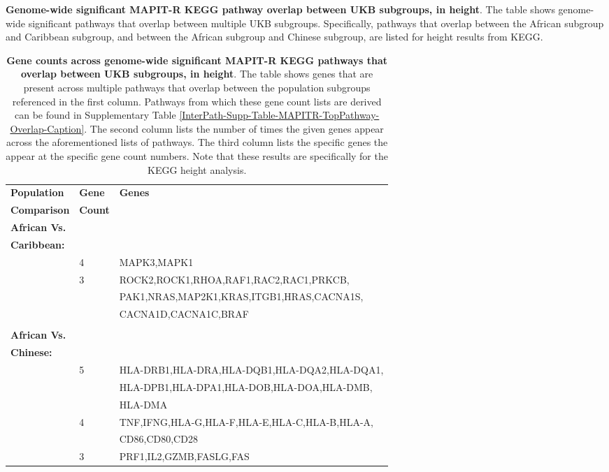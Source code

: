 \documentclass[12pt,a4paper]{article}
\begin{document}
\addtocounter{table}{-1}
\begin{table} [t!]
  \caption{\textbf{Genome-wide significant MAPIT-R KEGG pathway overlap between UKB subgroups, in height}. The table shows genome-wide significant pathways that overlap between multiple UKB subgroups. Specifically, pathways that overlap between the African subgroup and Caribbean subgroup, and between the African subgroup and Chinese subgroup, are listed for height results from KEGG.}
\label{InterPath-Supp-Table-MAPITR-TopPathway-Overlap-Caption}
\end{table}
\clearpage

\setlength{\footskip}{2cm}
\begin{table}[ht]
\centering
\begin{tabular}{lll}
  \hline
 \textbf{Population} & \textbf{Gene} & \textbf{Genes} \\
 \textbf{Comparison} & \textbf{Count} & \\
  \hline
\textbf{African Vs.} & & \\
\textbf{Caribbean:} & & \\
& 4 & MAPK3,MAPK1 \\
& 3 & ROCK2,ROCK1,RHOA,RAF1,RAC2,RAC1,PRKCB, \\
& & PAK1,NRAS,MAP2K1,KRAS,ITGB1,HRAS,CACNA1S, \\
& & CACNA1D,CACNA1C,BRAF \\
\\
\textbf{African Vs.} & & \\
\textbf{Chinese:} & & \\
& 5 & HLA-DRB1,HLA-DRA,HLA-DQB1,HLA-DQA2,HLA-DQA1, \\
& & HLA-DPB1,HLA-DPA1,HLA-DOB,HLA-DOA,HLA-DMB, \\
& & HLA-DMA \\
& 4 & TNF,IFNG,HLA-G,HLA-F,HLA-E,HLA-C,HLA-B,HLA-A, \\ 
& & CD86,CD80,CD28 \\
& 3 & PRF1,IL2,GZMB,FASLG,FAS \\
   \hline
\end{tabular}
\caption[TBD]{\textbf{Gene counts across genome-wide significant MAPIT-R KEGG pathways that overlap between UKB subgroups, in height}. The table shows genes that are present across multiple pathways that overlap between the population subgroups referenced in the first column. Pathways from which these gene count lists are derived can be found in Supplementary Table \ref{InterPath-Supp-Table-MAPITR-TopPathway-Overlap-Caption}. The second column lists the number of times the given genes appear across the aforementioned lists of pathways. The third column lists the specific genes the appear at the specific gene count numbers. Note that these results are specifically for the KEGG height analysis.}
\label{InterPath-Supp-Table-MAPITR-TopPathway-GeneCounts-Overlap}
\end{table}
\clearpage
\setlength{\footskip}{1cm}
\end{document}
